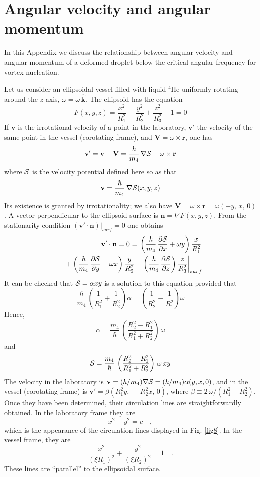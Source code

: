 \chapter{Angular velocity and angular momentum}

In this Appendix we discuss the relationship between angular velocity and angular momentum of a deformed droplet below the critical angular frequency for vortex 
nucleation.

Let us consider an ellipsoidal vessel filled with liquid $^4$He uniformly rotating around the $z$ axis, $\omega = \omega\, \hat{\mathbf{k}}$.
The ellipsoid has the equation
$$ F(x,y,z) =\frac{x^2}{R_1^2}+ \frac{y^2}{R_2^2}+  \frac{z^2}{R_3^2} - 1 = 0$$
%
If $\mathbf{v}$ is the  irrotational velocity of a point in the laboratory, $\mathbf{v}'$ the velocity of the same point in the vessel (corotating frame),  and 
$\mathbf{V}= \omega \times \mathbf{r}$, one has
%
$$\mathbf{v}'=  \mathbf{v} - \mathbf{V} = \frac{\hbar}{m_4} \, \nabla {\cal S} - \omega \times \mathbf{r}$$
%
where ${\cal S}$ is the velocity potential defined here so as  that 
%
$$\mathbf{v}= \frac{\hbar}{m_4} \, \nabla {\cal S}(x,y,z)$$
%
Its existence is granted by irrotationality;  we also have
  $\mathbf{V}= \omega \times \mathbf{r} = \omega (-y,\, x, \,0)$.
A vector  perpendicular to the ellipsoid  surface is 
%
$\mathbf{n} = \nabla  F(x,y,z)$.
%
From the stationarity condition 
%
$( \mathbf{v}'  \cdot  \mathbf{n})|_{surf} =0$
%
one obtains
%
\begin{eqnarray}
&&\mathbf{v}'  \cdot  \mathbf{n}= 0 = \left.\left(\frac{\hbar}{m_4} \, \frac{\partial {\cal S}}{\partial x} + \omega y\right) \frac{x}{R_1^2} \right.
\nonumber
\\
\nonumber
&&
+  \left. \left(\frac{\hbar}{m_4} \,\frac{\partial {\cal S}}{\partial y} - \omega x\right) \frac{y}{R_2^2} 
+  \left(\frac{\hbar}{m_4} \, \frac{\partial {\cal S}}{\partial z} \right) \frac{z}{R_3^2} \right|_{surf}
\end{eqnarray}
%
It can be checked that ${\cal S} = \alpha xy$ is a solution to this equation provided that
%
$$\frac{\hbar}{m_4} \,  \left( \frac{1}{R_1^2}  + \frac{1}{R_2^2} \right)  \alpha = \left(\frac{1}{R_2^2}  - \frac{1}{R_1^2} \right)  \omega$$
%
Hence,
%
$$ \alpha = \frac{m_4}{\hbar}\,\left( \frac{R_2^2-R_1^2}{R_1^2+R_2^2}\right) \, \omega$$
%
and
%
$$ {\cal S} = \frac{m_4}{\hbar} \, \left( \frac{R_2^2-R_1^2}{R_1^2+R_2^2}\right)  \, \omega \, xy$$
%
The velocity in the laboratory is 
$ \mathbf{v} = (\hbar/m_4)\nabla {\cal S}=  (\hbar/m_4)\alpha (y, x, 0) $,
and in the vessel (corotating frame) is
$\mathbf{v}'= \beta (R_1^2 y, \, -R_2 ^2 x, \,0) $, where $\beta \equiv  2 \, \omega/(R_1^2+R_2^2)$.
 Once they have been determined, their  circulation lines are straightforwardly obtained. 
In the laboratory frame they are
$$ x^2 - y^2 = c \quad ,$$
%
which is the appearance of the circulation lines displayed in Fig. \ref{fig8}. In the vessel  frame, they are
%
$$ \frac{x^2}{(\xi R_1)^2}+ \frac{ y^2}{(\xi R_2)^2} = 1 \quad .$$ 
%
These lines are ``parallel'' to the ellipsoidal surface.

